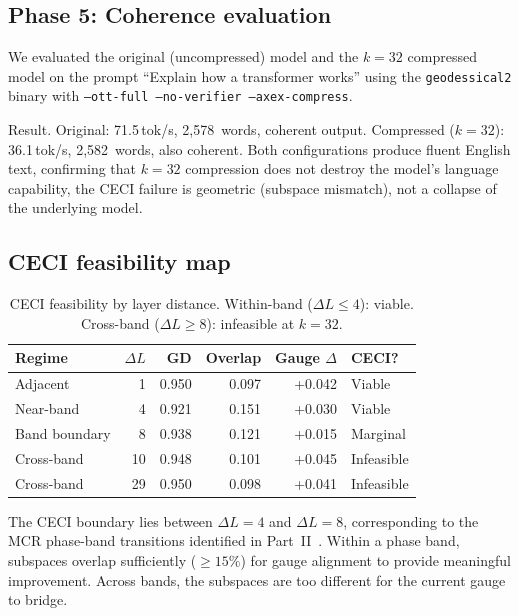 \documentclass[11pt]{article}
\begin{document}
\subsection{Phase 5: Coherence evaluation}

We evaluated the original (uncompressed) model and the $k{=}32$
compressed model on the prompt ``Explain how a transformer works''
using the \texttt{geodessical2} binary with
\texttt{--ott-full --no-verifier --axex-compress}.

Result.  Original: 71.5\,tok/s, 2,578~words, coherent output.
Compressed ($k{=}32$): 36.1\,tok/s, 2,582~words, also coherent.  Both
configurations produce fluent English text, confirming that $k{=}32$
compression does not destroy the model's language capability, the
CECI failure is geometric (subspace mismatch), not a collapse of the
underlying model.

\subsection{CECI feasibility map}

\begin{table}[h]\centering\small
\caption{CECI feasibility by layer distance.  Within-band
($\Delta L{\le}4$): viable.  Cross-band ($\Delta L{\ge}8$):
infeasible at $k{=}32$.}
\label{tab:ceci-feasibility}
\begin{tabular}{@{}lrrrrl@{}}
\toprule
Regime & $\Delta L$ & GD & Overlap & Gauge $\Delta$ & CECI? \\
\midrule
Adjacent       & 1    & 0.950 & 0.097 & +0.042 & Viable \\
Near-band      & 4    & 0.921 & 0.151 & +0.030 & Viable \\
Band boundary  & 8    & 0.938 & 0.121 & +0.015 & Marginal \\
Cross-band     & 10   & 0.948 & 0.101 & +0.045 & Infeasible \\
Cross-band     & 29   & 0.950 & 0.098 & +0.041 & Infeasible \\
\bottomrule
\end{tabular}
\end{table}

The CECI boundary lies between $\Delta L{=}4$ and $\Delta L{=}8$,
corresponding to the MCR phase-band transitions identified in
Part~II~\cite{stewart2026gp}.  Within a phase band, subspaces overlap
sufficiently (${\ge}15\%$) for gauge alignment to provide meaningful
improvement.  Across bands, the subspaces are too different for the
current gauge to bridge.
\end{document}
